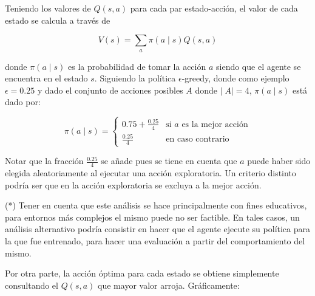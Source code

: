 \documentclass[11pt]{article}
\begin{document}
Teniendo los valores de \(Q(s,a)\) para cada par estado-acción, el valor
de cada estado se calcula a través de

\[V(s) = \sum_{a} \pi(a \mid s) Q(s, a) \]

donde \(\pi(a \mid s)\) es la probabilidad de tomar la acción \(a\)
siendo que el agente se encuentra en el estado \(s\). Siguiendo la
política \(\epsilon\)-greedy, donde como ejemplo \(\epsilon = 0.25\) y
dado el conjunto de acciones posibles \(A\) donde \(\mid\;A\mid=4\),
\(\pi(a \mid s)\) está dado por:

\[ \pi(a \mid s) = \begin{cases}
                        0.75 + \frac{0.25}{4} & \text{si $a$ es la mejor acción}\\
                        \frac{0.25}{4} & \text{en caso contrario}
                   \end{cases}
\]

Notar que la fracción \(\frac{0.25}{4}\) se añade pues se tiene en
cuenta que \(a\) puede haber sido elegida aleatoriamente al ejecutar una
acción exploratoria. Un criterio distinto podría ser que en la acción
exploratoria se excluya a la mejor acción.

(*) Tener en cuenta que este análisis se hace principalmente con fines
educativos, para entornos más complejos el mismo puede no ser factible.
En tales casos, un análisis alternativo podría consistir en hacer que el
agente ejecute su política para la que fue entrenado, para hacer una
evaluación a partir del comportamiento del mismo.

    Por otra parte, la acción óptima para cada estado se obtiene simplemente
consultando el \(Q(s,a)\) que mayor valor arroja. Gráficamente:
\end{document}

